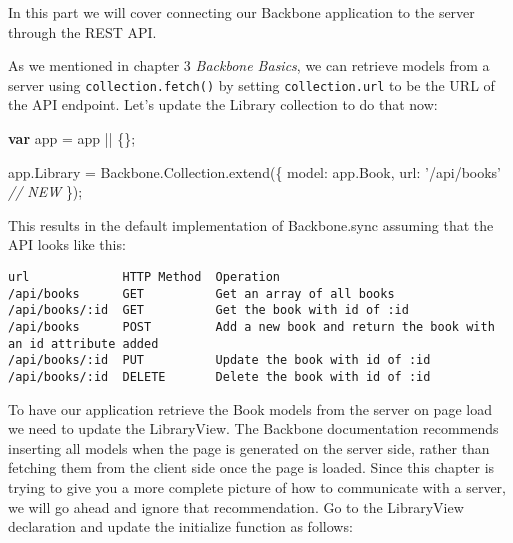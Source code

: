 \documentclass[9pt]{book}
\newenvironment{Shaded}{}{}
\newcommand{\KeywordTok}[1]{\textcolor[rgb]{0.00,0.44,0.13}{\textbf{{#1}}}}
\newcommand{\DataTypeTok}[1]{\textcolor[rgb]{0.56,0.13,0.00}{{#1}}}
\newcommand{\StringTok}[1]{\textcolor[rgb]{0.25,0.44,0.63}{{#1}}}
\newcommand{\CommentTok}[1]{\textcolor[rgb]{0.38,0.63,0.69}{\textit{{#1}}}}
\newcommand{\OtherTok}[1]{\textcolor[rgb]{0.00,0.44,0.13}{{#1}}}
\newcommand{\FunctionTok}[1]{\textcolor[rgb]{0.02,0.16,0.49}{{#1}}}
\newcommand{\NormalTok}[1]{{#1}}
\begin{document}
In this part we will cover connecting our Backbone application to the
server through the REST API.

As we mentioned in chapter 3 \emph{Backbone Basics}, we can retrieve
models from a server using \texttt{collection.fetch()} by setting
\texttt{collection.url} to be the URL of the API endpoint. Let's update
the Library collection to do that now:

\begin{Shaded}
\begin{Highlighting}[]
\KeywordTok{var} \NormalTok{app = app || \{\};}

\OtherTok{app}\NormalTok{.}\FunctionTok{Library} \NormalTok{= }\OtherTok{Backbone}\NormalTok{.}\OtherTok{Collection}\NormalTok{.}\FunctionTok{extend}\NormalTok{(\{}
    \DataTypeTok{model}\NormalTok{: }\OtherTok{app}\NormalTok{.}\FunctionTok{Book}\NormalTok{,}
    \DataTypeTok{url}\NormalTok{: }\StringTok{'/api/books'}     \CommentTok{// NEW}
\NormalTok{\});}
\end{Highlighting}
\end{Shaded}

This results in the default implementation of Backbone.sync assuming
that the API looks like this:

\begin{verbatim}
url             HTTP Method  Operation
/api/books      GET          Get an array of all books
/api/books/:id  GET          Get the book with id of :id
/api/books      POST         Add a new book and return the book with an id attribute added
/api/books/:id  PUT          Update the book with id of :id
/api/books/:id  DELETE       Delete the book with id of :id
\end{verbatim}

To have our application retrieve the Book models from the server on page
load we need to update the LibraryView. The Backbone documentation
recommends inserting all models when the page is generated on the server
side, rather than fetching them from the client side once the page is
loaded. Since this chapter is trying to give you a more complete picture
of how to communicate with a server, we will go ahead and ignore that
recommendation. Go to the LibraryView declaration and update the
initialize function as follows:
\end{document}
